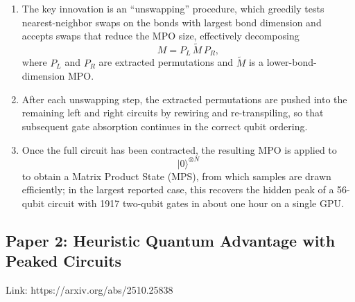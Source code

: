 \begin{enumerate}
    \item The key innovation is an ``unswapping'' procedure, which greedily tests nearest-neighbor swaps on the bonds with largest bond dimension and accepts swaps that reduce the MPO size, effectively decomposing
    \[
        M = P_L \, \widetilde{M} \, P_R,
    \]
    where \(P_L\) and \(P_R\) are extracted permutations and \(\widetilde{M}\) is a lower-bond-dimension MPO.
    
    \item After each unswapping step, the extracted permutations are pushed into the remaining left and right circuits by rewiring and re-transpiling, so that subsequent gate absorption continues in the correct qubit ordering.
    
    \item Once the full circuit has been contracted, the resulting MPO is applied to
    \[
        |0\rangle^{\otimes N}
    \]
    to obtain a Matrix Product State (MPS), from which samples are drawn efficiently; in the largest reported case, this recovers the hidden peak of a 56-qubit circuit with 1917 two-qubit gates in about one hour on a single GPU.
\end{enumerate}

\subsection{Paper 2: Heuristic Quantum Advantage with Peaked Circuits}

Link: https://arxiv.org/abs/2510.25838

